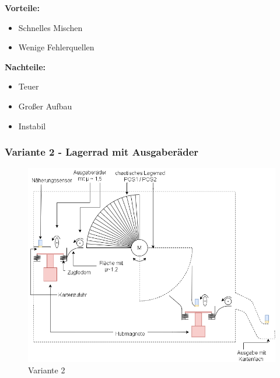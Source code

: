 \textbf{Vorteile:}
\begin{itemize}
    \item Schnelles Mischen
    \item Wenige Fehlerquellen
\end{itemize}
\textbf{Nachteile:}
\begin{itemize}
    \item Teuer
    \item Großer Aufbau
    \item Instabil
\end{itemize}

\newpage

\subsubsection{Variante 2 - Lagerrad mit Ausgaberäder}

\begin{figure}[H]
    \centering
    \includegraphics[scale=0.6,page=1]{fig/mech/V1904-Page-2.png}
    \caption{Variante 2}
\end{figure}

